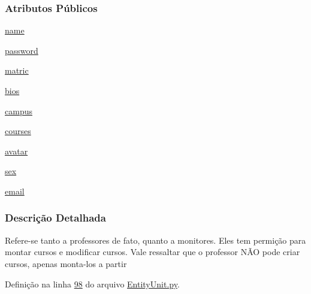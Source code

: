 \subsubsection*{Atributos Públicos}
\begin{DoxyCompactItemize}
\item 
\hyperlink{classELO_1_1EntityUnit_1_1Professor_ae85cc0fc9c64a277111a85e87efbe049}{name}
\item 
\hyperlink{classELO_1_1EntityUnit_1_1Professor_af0810854479e9f9a806eb6bfe7468e60}{password}
\item 
\hyperlink{classELO_1_1EntityUnit_1_1Professor_afc64d3f1b0e7c88530c7ee62f67ef671}{matric}
\item 
\hyperlink{classELO_1_1EntityUnit_1_1Professor_a2e403e0bfc353dcdf9988140d61d5ca7}{bios}
\item 
\hyperlink{classELO_1_1EntityUnit_1_1Professor_ad95cfc8959dcb02a6afff422703d4dde}{campus}
\item 
\hyperlink{classELO_1_1EntityUnit_1_1Professor_a6eb0d2789bb8750fb275aca0f8bb74bb}{courses}
\item 
\hyperlink{classELO_1_1EntityUnit_1_1Professor_a593a0636e87dcdd9ced2e6b7494a45dc}{avatar}
\item 
\hyperlink{classELO_1_1EntityUnit_1_1Professor_ac049dc360c4af27037158e33577288e1}{sex}
\item 
\hyperlink{classELO_1_1EntityUnit_1_1Professor_a7c6f76f185515050334dc74a030043a7}{email}
\end{DoxyCompactItemize}


\subsubsection{Descrição Detalhada}
Refere-\/se tanto a professores de fato, quanto a monitores. Eles tem permição para montar cursos e modificar cursos. Vale ressaltar que o professor NÃ\-O pode criar cursos, apenas monta-\/los a partir 

Definição na linha \hyperlink{EntityUnit_8py_source_l00098}{98} do arquivo \hyperlink{EntityUnit_8py_source}{Entity\-Unit.\-py}.



